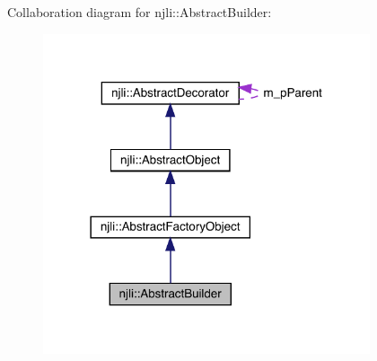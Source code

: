 Collaboration diagram for njli\+:\+:Abstract\+Builder\+:\nopagebreak
\begin{figure}[H]
\begin{center}
\leavevmode
\includegraphics[width=273pt]{classnjli_1_1_abstract_builder__coll__graph}
\end{center}
\end{figure}
